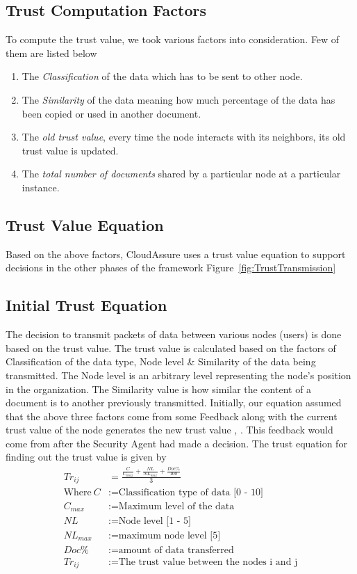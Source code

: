 \subsection{Trust Computation Factors}
To compute the trust value, we took various factors into consideration. Few of them are listed
below
\begin{enumerate}
    \item The \emph{Classification} of the data which has to be sent to other node.
    \item The \emph{Similarity} of the data meaning how much percentage of the data has been copied
or used in another document.
    \item The \emph{old trust value}, every time the node interacts with its neighbors, its old trust value
is updated.
    \item The \emph{total number of documents} shared by a particular node at a particular instance.
\end{enumerate}
    \subsection{Trust Value Equation}
Based on the above factors, CloudAssure uses a trust value equation to support
decisions in the other phases of the framework Figure~\ref{fig:TrustTransmission}

\subsection{Initial Trust Equation}


The decision to transmit packets of data between various nodes (users) is done
based on the trust value. The trust value is calculated based on the factors of
Classification of the data type, Node level \& Similarity of the data being transmitted. The Node level is an arbitrary level representing the node's position in the organization. The Similarity value is how similar the content of a document is to another previously transmitted.
Initially, our equation assumed that the above three factors come from some
Feedback along with the current trust value of the node generates the new trust
value \autocite{L.Xiong2004}, \autocite{YanWang2007}. This feedback would come from after the Security Agent had made
a decision. The trust equation for finding out the trust value is given by
\begin{equation}
    \label{eq:init_trust}
    \begin{aligned}
         Tr_{ij}&=\frac{\frac{C}{C_{max}} + \frac{NL}{NL_{max}}
         + \frac{Doc\%}{100}}{3} \\
    \text{Where}~C &:= \text{Classification type of data [0 - 10]} \\
C_{max} &:= \text{Maximum level of the data} \\
NL &:= \text{Node level [1 - 5]} \\
NL_{max} &:= \text{maximum node level [5]} \\
Doc\% &:= \text{amount of data transferred} \\
Tr_{ij} &:= \text{The trust value between the nodes i and j}
\end{aligned}
\end{equation}

